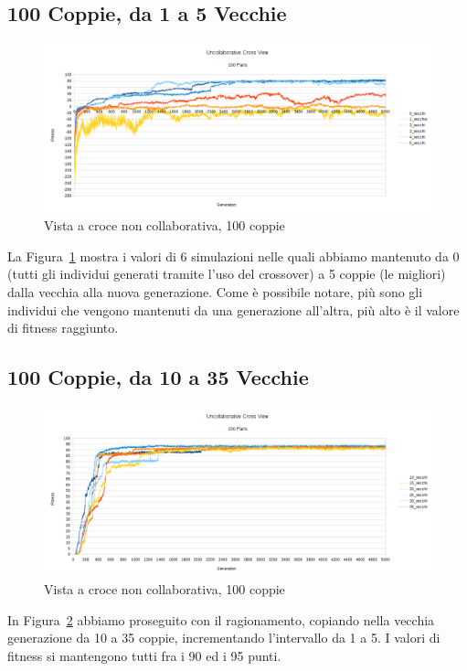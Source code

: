 \subsection{100 Coppie, da 1 a 5 Vecchie}
\begin{figure}[ht]
	\centering
	\includegraphics[scale=0.7,angle=90]{imgs/cross_nc_100_pairs_0_5_old.png}
	\caption{Vista a croce non collaborativa, 100 coppie}
	\label{figure:cross_nc_100_0_5}
\end{figure}
La Figura~\ref{figure:cross_nc_100_0_5} mostra i valori di 6 simulazioni nelle
quali abbiamo mantenuto da 0 (tutti gli individui generati tramite l'uso del
crossover) a 5 coppie (le migliori) dalla vecchia alla nuova generazione. Come è
possibile notare, più sono gli individui che vengono mantenuti da una
generazione all'altra, più alto è il valore di fitness raggiunto.

\subsection{100 Coppie, da 10 a 35 Vecchie}
\begin{figure}[ht]
	\centering
	\includegraphics[scale=0.7,angle=90]{imgs/cross_nc_100_pairs_10_35_old.png}
	\caption{Vista a croce non collaborativa, 100 coppie}
	\label{figure:cross_nc_100_10_35}
\end{figure}
In Figura~\ref{figure:cross_nc_100_10_35} abbiamo proseguito con il
ragionamento, copiando nella vecchia generazione da 10 a 35 coppie,
incrementando l'intervallo da 1 a 5. I valori di fitness si mantengono tutti fra
i 90 ed i 95 punti.

